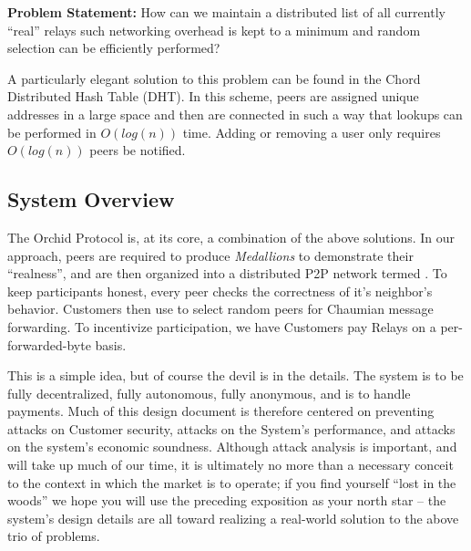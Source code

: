 \textbf{Problem Statement:} How can we maintain a distributed list of
all currently ``real'' relays such networking overhead is kept to a
minimum and random selection can be efficiently performed?

A particularly elegant solution to this problem can be found in the
Chord\cite{CHORD} Distributed Hash Table (DHT). In this scheme, peers
are assigned unique addresses in a large space and then are connected
in such a way that lookups can be performed in $O(log(n))$ time. Adding
or removing a user only requires $O(log(n))$ peers be notified.

\subsection{System Overview}

The Orchid Protocol is, at its core, a combination of the above
solutions. In our approach, peers are required to
produce \emph{Medallions} to demonstrate their ``realness'', and are
then organized into a distributed P2P network termed \tOM{}. To
keep \tOM{} participants honest, every peer checks the correctness of
it's neighbor's behavior. Customers then use \tOM{} to select random
peers for Chaumian message forwarding. To incentivize participation,
we have Customers pay Relays on a per-forwarded-byte basis.

This is a simple idea, but of course the devil is in the details. The
system is to be fully decentralized, fully autonomous, fully
anonymous, and is to handle payments. Much of this design document is
therefore centered on preventing attacks on Customer security, attacks
on the System's performance, and attacks on the system's economic
soundness. Although attack analysis is important, and will take up
much of our time, it is ultimately no more than a necessary conceit to
the context in which the market is to operate; if you find yourself
``lost in the woods'' we hope you will use the preceding exposition as
your north star -- the system's design details are all toward
realizing a real-world solution to the above trio of problems.
